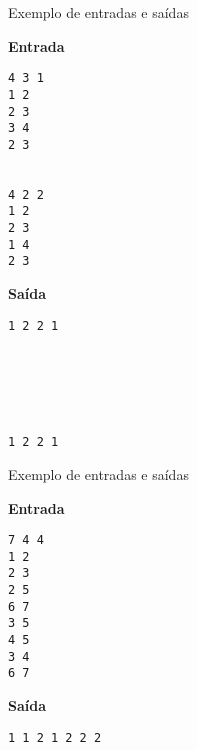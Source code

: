 \begin{frame}[fragile]{Exemplo de entradas e saídas}

\begin{minipage}[t]{0.55\textwidth}
\textbf{Entrada}
\begin{verbatim}
4 3 1
1 2
2 3
3 4
2 3


4 2 2
1 2
2 3
1 4
2 3
\end{verbatim}
\end{minipage}
\begin{minipage}[t]{0.4\textwidth}
\textbf{Saída}
\begin{verbatim}
1 2 2 1






1 2 2 1
\end{verbatim}
\end{minipage}
\end{frame}

\begin{frame}[fragile]{Exemplo de entradas e saídas}

\begin{minipage}[t]{0.55\textwidth}
\textbf{Entrada}
\begin{verbatim}
7 4 4
1 2
2 3
2 5
6 7
3 5
4 5
3 4
6 7
\end{verbatim}
\end{minipage}
\begin{minipage}[t]{0.4\textwidth}
\textbf{Saída}
\begin{verbatim}
1 1 2 1 2 2 2
\end{verbatim}
\end{minipage}
\end{frame}

